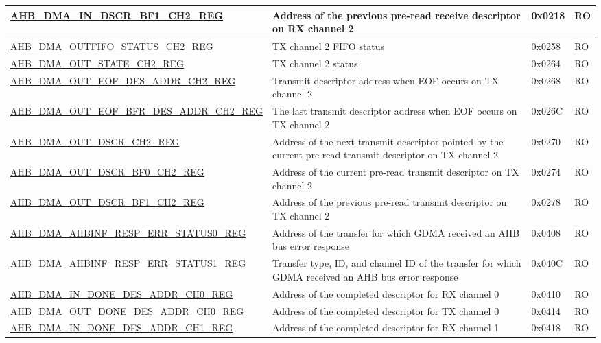 \begin{longtable}{ | p{8cm} | p{8cm} | p{1.3cm} | p{1.5cm} | }
\hyperref[regdesc:AHBDMAINDSCRBF1CHNREG]{AHB\_DMA\_IN\_DSCR\_BF1\_CH2\_REG} & Address of the previous pre-read receive descriptor on RX channel 2 & 0x0218 & RO \\ \hline
\hyperref[regdesc:AHBDMAOUTFIFOSTATUSCHNREG]{AHB\_DMA\_OUTFIFO\_STATUS\_CH2\_REG} & TX channel 2 FIFO status & 0x0258 & RO \\ \hline
\hyperref[regdesc:AHBDMAOUTSTATECHNREG]{AHB\_DMA\_OUT\_STATE\_CH2\_REG} & TX channel 2 status & 0x0264 & RO \\ \hline
\hyperref[regdesc:AHBDMAOUTEOFDESADDRCHNREG]{AHB\_DMA\_OUT\_EOF\_DES\_ADDR\_CH2\_REG} & Transmit descriptor address when EOF occurs on TX channel 2 & 0x0268 & RO \\ \hline
\hyperref[regdesc:AHBDMAOUTEOFBFRDESADDRCHNREG]{AHB\_DMA\_OUT\_EOF\_BFR\_DES\_ADDR\_CH2\_REG} & The last transmit descriptor address when EOF occurs on TX channel 2 & 0x026C & RO \\ \hline
\hyperref[regdesc:AHBDMAOUTDSCRCHNREG]{AHB\_DMA\_OUT\_DSCR\_CH2\_REG} & Address of the next transmit descriptor pointed by the current pre-read transmit descriptor on TX channel 2 & 0x0270 & RO \\ \hline
\hyperref[regdesc:AHBDMAOUTDSCRBF0CHNREG]{AHB\_DMA\_OUT\_DSCR\_BF0\_CH2\_REG} & Address of the current pre-read transmit descriptor on TX channel 2 & 0x0274 & RO \\ \hline
\hyperref[regdesc:AHBDMAOUTDSCRBF1CHNREG]{AHB\_DMA\_OUT\_DSCR\_BF1\_CH2\_REG} & Address of the previous pre-read transmit descriptor on TX channel 2 & 0x0278 & RO \\ \hline
\hyperref[regdesc:AHBDMAAHBINFRESPERRSTATUS0REG]{AHB\_DMA\_AHBINF\_RESP\_ERR\_STATUS0\_REG} & Address of the transfer for which GDMA received an AHB bus error response & 0x0408 & RO \\ \hline
\hyperref[regdesc:AHBDMAAHBINFRESPERRSTATUS1REG]{AHB\_DMA\_AHBINF\_RESP\_ERR\_STATUS1\_REG} & Transfer type, ID, and channel ID of the transfer for which GDMA received an AHB bus error response & 0x040C & RO \\ \hline
\hyperref[regdesc:AHBDMAINDONEDESADDRCHNREG]{AHB\_DMA\_IN\_DONE\_DES\_ADDR\_CH0\_REG} & Address of the completed descriptor for RX channel 0 & 0x0410 & RO \\ \hline
\hyperref[regdesc:AHBDMAOUTDONEDESADDRCHNREG]{AHB\_DMA\_OUT\_DONE\_DES\_ADDR\_CH0\_REG} & Address of the completed descriptor for TX channel 0 & 0x0414 & RO \\ \hline
\hyperref[regdesc:AHBDMAINDONEDESADDRCHNREG]{AHB\_DMA\_IN\_DONE\_DES\_ADDR\_CH1\_REG} & Address of the completed descriptor for RX channel 1 & 0x0418 & RO \\ \hline

\end{longtable}
